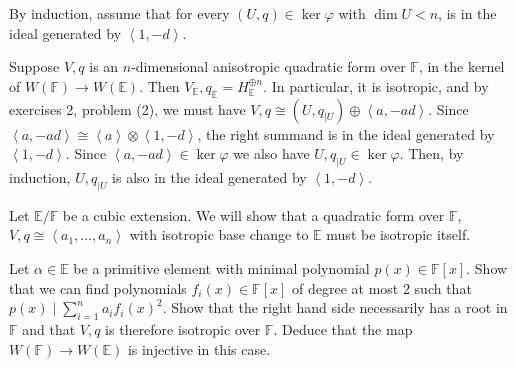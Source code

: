 \documentclass[12 pt, letterpaper]{hmcpset}
\begin{document}
\begin{solution}
	By induction, assume that for every $(U, q) \in \ker \varphi$ with $\dim U < n$, is in the ideal generated by $\left < 1, -d \right >$.

	Suppose $V, q$ is an $n$-dimensional anisotropic quadratic form over $\mathbb{F}$, in the kernel of $W(\mathbb{F}) \to W(\mathbb{E})$. Then $V_{\mathbb{E}}, q_{\mathbb{E}} = H_{\mathbb{E}}^{\oplus n}$. In particular, it is isotropic, and by exercises 2, problem (2), we must have $V, q \cong (U, q_{\mid U}) \oplus \left < a, -ad \right >$. Since $\left < a, -ad \right > \cong \left < a \right > \otimes \left < 1, -d \right >$, the right summand is in the ideal generated by $\left < 1, -d \right >$. Since $\left < a, -ad \right > \in \ker \varphi$ we also have $U, q_{\mid U} \in \ker \varphi$. Then, by induction, $U, q_{\mid U}$ is also in the ideal generated by $\left < 1, -d \right >$.
\end{solution}

\pagebreak

\begin{problem}[(4)]
	Let $\mathbb{E} / \mathbb{F}$ be a cubic extension. We will show that a quadratic form over $\mathbb{F}$, $V, q \cong \left < a_{1}, \dots, a_{n} \right >$ with isotropic base change to $\mathbb{E}$ must be isotropic itself. 

	Let $\alpha \in \mathbb{E}$ be a primitive element with minimal polynomial $p(x) \in \mathbb{F}[x]$. Show that we can find polynomials  $f_{i}(x) \in \mathbb{F}[x]$ of degree at most $2$ such that $p(x) \mid \sum_{i = 1}^{n} a_{i} f_{i}(x)^{2}$. Show that the right hand side necessarily has a root in $\mathbb{F}$ and that $V, q$ is therefore isotropic over $\mathbb{F}$. Deduce that the map $W(\mathbb{F}) \to W(\mathbb{E})$ is injective in this case.
\end{problem}
\end{document}
